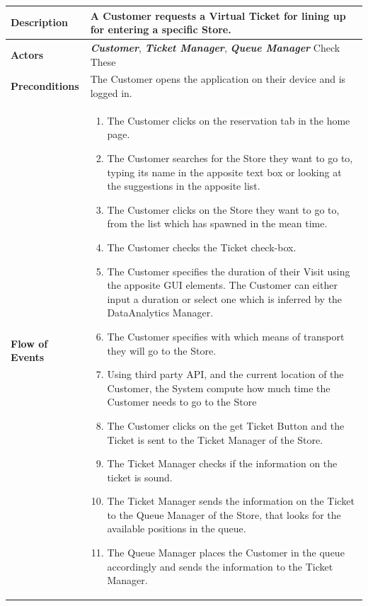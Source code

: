 \documentclass[a4paper, 12pt, oneside]{article}
\newcommand*{\lorenzo}[1]{\textcolor{BurntOrange}{#1}}
\begin{document}
\begin{enumerate}[labelindent=20pt, label={UC.\arabic*}, itemindent=1em,leftmargin=!]
\begin{tabularx}{\linewidth}{| l | X |}
    \hline
    \textbf{Description} & A Customer requests a Virtual Ticket for lining up for entering a specific Store.\\
    

    \hline
    \textbf{Actors} & \textbf{\textit{Customer}}, \textit{\textbf{Ticket Manager}}, \textit{\textbf{Queue Manager}} \lorenzo{Check These}\\
    
    \hline
    \textbf{Preconditions} & The Customer opens the application on their device and is logged in.\\
    
    \hline
    \textbf{Flow of Events} & \parbox{0.7\textwidth}{   
        \begin{enumerate}
            \item The Customer clicks on the reservation tab in the home page.
            \item The Customer searches for the Store they want to go to, typing its name in the apposite text box or looking at the suggestions in the apposite list.
            \item The Customer clicks on the Store they want to go to, from the list which has spawned in the mean time.
            \item The Customer checks the Ticket check-box.
            \item The Customer specifies the duration of their Visit using the apposite GUI elements. The Customer can either input a duration or select one which is inferred by the DataAnalytics Manager.
            \item The Customer specifies with which means of transport they will go to the Store.
            \item Using third party API, and the current location of the Customer, the System compute how much time the Customer needs to go to the Store
            \item The Customer clicks on the get Ticket Button and the Ticket is sent to the Ticket Manager of the Store.
            \item The Ticket Manager checks if the information on the ticket is sound.
            \item The Ticket Manager sends the information on the Ticket to the Queue Manager of the Store, that looks for the available positions in the queue.
            \item The Queue Manager places the Customer in the queue accordingly and sends the information to the Ticket Manager.

\end{enumerate}}
\end{tabularx}
\end{enumerate}
\end{document}
